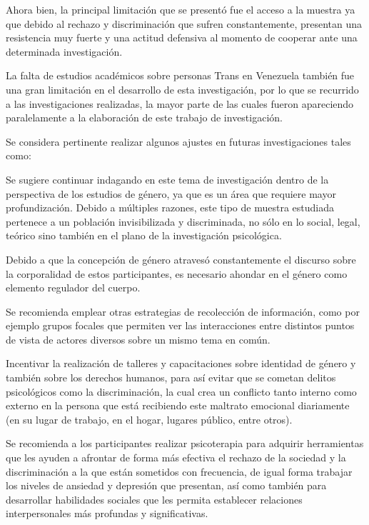 Ahora bien, la principal limitación que se presentó fue el acceso a la muestra
ya que debido al rechazo y discriminación que sufren constantemente, presentan
una resistencia muy fuerte y una actitud defensiva al momento de cooperar ante
una determinada investigación.

La falta de estudios académicos sobre personas Trans en Venezuela también fue
una gran limitación en el desarrollo de esta investigación, por lo que se
recurrido a las investigaciones realizadas, la mayor parte de las cuales fueron
apareciendo paralelamente a la elaboración de este trabajo de investigación.

Se considera pertinente realizar algunos ajustes en futuras investigaciones
tales como:

Se sugiere continuar indagando en este tema de investigación dentro de la
perspectiva de los estudios de género, ya que es un área que requiere mayor
profundización. Debido a múltiples razones, este tipo de muestra estudiada
pertenece a un población invisibilizada y discriminada, no sólo en lo social,
legal, teórico sino también en el plano de la investigación psicológica.

Debido a que la concepción de género atravesó constantemente el discurso sobre
la corporalidad de estos participantes, es necesario ahondar en el género como
elemento regulador del cuerpo.

Se recomienda emplear otras estrategias de recolección de información, como por
ejemplo grupos focales que permiten ver las interacciones entre distintos puntos
de vista de actores diversos sobre un mismo tema en común.

Incentivar la realización de talleres y capacitaciones sobre identidad de género
y también sobre los derechos humanos, para así evitar que se cometan delitos
psicológicos como la discriminación, la cual crea un conflicto tanto interno
como externo en la persona que está recibiendo este maltrato emocional
diariamente (en su lugar de trabajo, en el hogar, lugares público, entre otros).

Se recomienda a los participantes realizar psicoterapia para adquirir
herramientas que les ayuden a afrontar de forma más efectiva el rechazo de la
sociedad y la discriminación a la que están sometidos con frecuencia, de igual
forma trabajar los niveles de ansiedad y depresión que presentan, así como
también para desarrollar habilidades sociales que les permita establecer
relaciones interpersonales más profundas y significativas.
